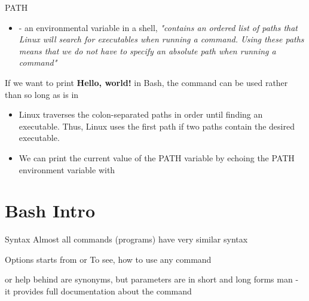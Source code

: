 \documentclass[usenames,dvipsnames,10pt,aspectratio=169]{beamer}
\begin{document}
\begin{frame}{PATH}
    \begin{itemize}
        \item {}- an environmental variable in a shell, \textit{"contains an ordered list of paths that Linux will search for executables when running a command. Using these paths means that we do not have to specify an absolute path when running a command"}
    \end{itemize}
    \begin{example}
        If we want to print \textbf{Hello, world!} in Bash, the command  can be used rather than  so long as  is in 
    \end{example}
    \begin{itemize}
        \item Linux traverses the colon-separated paths in order until finding an executable. Thus, Linux uses the first path if two paths contain the desired executable.

        \item We can print the current value of the PATH variable by echoing the PATH environment variable with 
    \end{itemize}
\end{frame}

\section{Bash Intro}

\begin{frame}{Syntax}
    Almost all commands (programs) have very similar syntax
    \begin{examples}
    \end{examples}
    Options starts from \ex{-} or \ex{-{}-} \newline
    To see, how to use any command
    \begin{examples}
         \newline or
        help \newline behind are synonyms, but parameters are in short and long forms \newline
        man   - it provides full documentation about the command
    \end{examples}
\end{frame}
\end{document}
